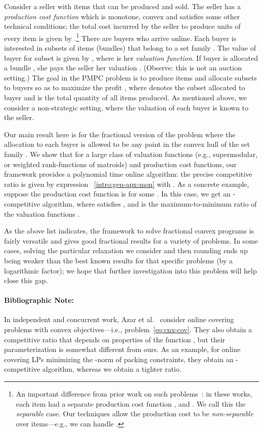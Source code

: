 \documentclass[letterpaper,11pt]{article}
\begin{document}
\begin{itemize}
  Consider a seller with  items that can be produced and sold.  The seller has a \emph{production cost function}  which is monotone, convex and satisfies some other technical conditions; the total cost incurred by the seller to produce  units of every item  is given by .\footnote{An important difference from prior work on such problems~\cite{BGMS11,HK15}: in these works, each item  had a separate production cost function , and . We call this the \emph{separable} case. Our techniques allow the production cost to be {\em non-separable} over items---e.g., we can handle .}  There are  buyers who arrive online. Each buyer  is interested in subsets of items (bundles) that belong to a set family . The value of buyer  for subset  is given by , where  is her \emph{valuation function}. If buyer  is allocated a bundle , she pays the seller her valuation . (Observe: this is not an auction setting.) The goal in the PMPC problem is to produce items and allocate subsets to buyers so as to maximize the profit , where  denotes the subset allocated to buyer  and  is the total quantity of all items produced.  As mentioned above, we consider a non-strategic setting, where the valuation of each buyer is known to the seller.

  Our main result here is for the fractional version of the problem where the allocation to each buyer  is allowed to be any point in the convex hull of the set family . We show that for a large class of valuation functions (e.g., supermodular, or weighted rank-functions of matroids) and production cost functions, our framework provides a polynomial time online algorithm: the precise competitive ratio is given by expression ~\eqref{intro:gen-apx-mon} with . As a concrete example, suppose the production cost function is  for some . In this case, we get an -competitive algorithm, where  satisfies , and  is the maximum-to-minimum ratio of the valuation functions .
\end{itemize}

As the above list indicates, the framework to solve fractional convex
programs is fairly versatile and gives good fractional results for a
variety of problems. In some cases, solving the particular relaxation we
consider and then rounding ends up being weaker than the best known
results for that specific problems (by a logarithmic factor); we hope
that further investigation into this problem will help close this gap.

\paragraph{Bibliographic Note:} In independent and concurrent work,
Azar et al.~\cite{ACP14} consider online covering problems with convex
objectives---i.e., problem~\eqref{eq:cnx-cov}. They also obtain a
competitive ratio that depends on properties of the function , but
their parameterization is somewhat different from ours. As an example,
for online covering LPs minimizing the -norm of packing
constraints, they obtain an -competitive
algorithm, whereas we obtain a tighter  ratio.
\end{document}
